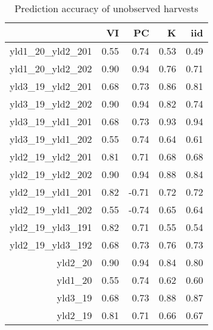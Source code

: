 \documentclass[12pt, letterpaper]{article}
\begin{document}
\begin{table}[ht]
\caption{Prediction accuracy of unobserved harvests}
\centering
\begin{tabular}{rrrrr}
  \hline
 & VI & PC & K & iid \\ 
  \hline
yld1\_20\_yld2\_201 & 0.55 & 0.74 & 0.53 & 0.49 \\ 
  yld1\_20\_yld2\_202 & 0.90 & 0.94 & 0.76 & 0.71 \\ 
  yld3\_19\_yld2\_201 & 0.68 & 0.73 & 0.86 & 0.81 \\ 
  yld3\_19\_yld2\_202 & 0.90 & 0.94 & 0.82 & 0.74 \\ 
  yld3\_19\_yld1\_201 & 0.68 & 0.73 & 0.93 & 0.94 \\ 
  yld3\_19\_yld1\_202 & 0.55 & 0.74 & 0.64 & 0.61 \\ 
  yld2\_19\_yld2\_201 & 0.81 & 0.71 & 0.68 & 0.68 \\ 
  yld2\_19\_yld2\_202 & 0.90 & 0.94 & 0.88 & 0.84 \\ 
  yld2\_19\_yld1\_201 & 0.82 & -0.71 & 0.72 & 0.72 \\ 
  yld2\_19\_yld1\_202 & 0.55 & -0.74 & 0.65 & 0.64 \\ 
  yld2\_19\_yld3\_191 & 0.82 & 0.71 & 0.55 & 0.54 \\ 
  yld2\_19\_yld3\_192 & 0.68 & 0.73 & 0.76 & 0.73 \\ 
  yld2\_20 & 0.90 & 0.94 & 0.84 & 0.80 \\ 
  yld1\_20 & 0.55 & 0.74 & 0.62 & 0.60 \\ 
  yld3\_19 & 0.68 & 0.73 & 0.88 & 0.87 \\ 
  yld2\_19 & 0.81 & 0.71 & 0.66 & 0.67 \\ 
   \hline
\end{tabular}
\end{table}
\end{document}
